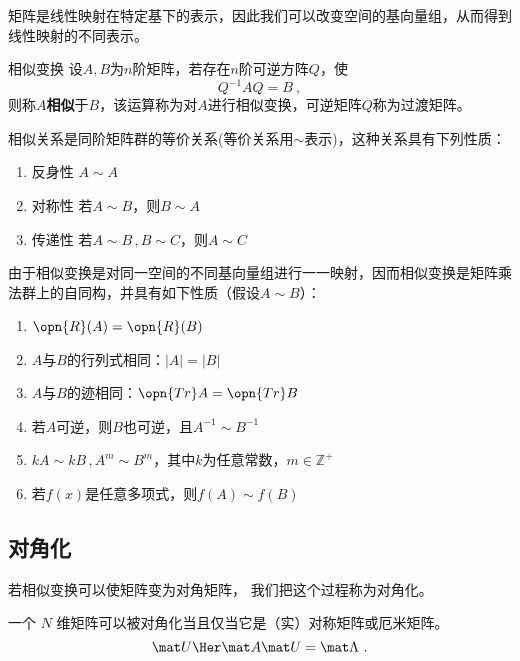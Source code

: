 
\begin{issues}
\issueDraft
\end{issues}


矩阵是线性映射在特定基下的表示，因此我们可以改变空间的基向量组，从而得到线性映射的不同表示。
\begin{definition}{相似变换}\label{def_MatSim_1}
设$A,B$为$n$阶矩阵，若存在$n$阶可逆方阵$Q$，使
\begin{equation}
Q^{-1}AQ=B~,
\end{equation}
则称$A$\textbf{相似}于$B$，该运算称为对$A$进行相似变换，可逆矩阵$Q$称为过渡矩阵。
\end{definition}
相似关系是同阶矩阵群的等价关系(等价关系用$\sim $表示)，这种关系具有下列性质：

\begin{enumerate}
\item 反身性 $A\sim A$ 
\item 对称性 若$A\sim B$，则$B\sim A$
\item 传递性 若$A\sim B\,,B\sim C$，则$A\sim C$
\end{enumerate}
由于相似变换是对同一空间的不同基向量组进行一一映射，因而相似变换是矩阵乘法群上的自同构，并具有如下性质（假设$A\sim B$）：
\begin{enumerate}
\item $\opn{R}(A)=\opn{R}(B)$
\item $A$与$B$的行列式相同：$|A|=|B|$
\item $A$与$B$的迹相同：$\opn{Tr}A=\opn{Tr}B$
\item 若$A$可逆，则$B$也可逆，且$A^{-1}\sim B^{-1}$
\item $kA\sim kB\,,A^m\sim B^m$，其中$k$为任意常数，$m\in \mathbb Z^{+}$
\item 若$f(x)$是任意多项式，则$f(A)\sim f(B)$
\end{enumerate}
\subsection{对角化}
若相似变换可以使矩阵变为对角矩阵， 我们把这个过程称为对角化。

一个 $N$ 维矩阵可以被对角化当且仅当它是（实）对称矩阵或厄米矩阵。
\begin{equation}\label{eq_MatSim_1}
\mat U\Her \mat A \mat U = \mat \Lambda~.
\end{equation}

